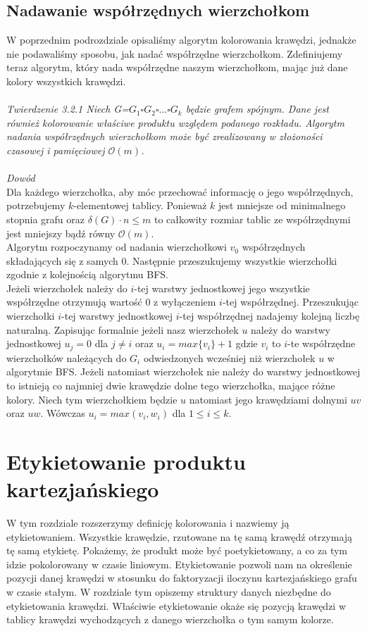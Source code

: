 \documentclass[12pt,a4paper,titlepage]{article}
\begin{document}
\subsection{Nadawanie współrzędnych wierzchołkom}
W poprzednim podrozdziale opisaliśmy algorytm kolorowania krawędzi, jednakże nie podawaliśmy sposobu, jak nadać współrzędne wierzchołkom. Zdefiniujemy teraz algorytm, który nada współrzędne naszym wierzchołkom, mając już dane kolory wszystkich krawędzi.\\
\\
\textit{Twierdzenie 3.2.1 Niech G=$G_1 \square G_2 \square ... \square G_k$ będzie grafem spójnym. Dane jest również kolorowanie właściwe produktu względem podanego rozkładu. Algorytm nadania współrzędnych wierzchołkom może być zrealizowany w złożoności czasowej i pamięciowej $\mathcal{O}(m)$.}\\
\\
\textit{Dowód}\\
Dla każdego wierzchołka, aby móc przechować informację o jego współrzędnych, potrzebujemy $k$-elementowej tablicy. Ponieważ $k$ jest mniejsze od minimalnego stopnia grafu oraz $\delta(G) \cdot n \leqslant m$ to całkowity rozmiar tablic ze współrzędnymi jest mniejszy bądź równy $\mathcal{O}(m)$.\\
Algorytm rozpoczynamy od nadania wierzchołkowi $v_0$ współrzędnych składających się z samych 0. Następnie przeszukujemy wszystkie wierzchołki zgodnie z kolejnością algorytmu BFS. \\Jeżeli wierzchołek należy do $i$-tej warstwy jednostkowej jego wszystkie współrzędne otrzymują wartość 0 z wyłączeniem $i$-tej współrzędnej. Przeszukując wierzchołki $i$-tej warstwy jednostkowej $i$-tej współrzędnej nadajemy kolejną liczbę naturalną. Zapisując formalnie jeżeli nasz wierzchołek $u$ należy do warstwy jednostkowej $u_j =0$ dla $j \neq i$
oraz $u_i = max\{v_i\}+1$ gdzie $v_i $ to $i$-te współrzędne wierzchołków należących do $G_i$ odwiedzonych wcześniej niż wierzchołek $u$ w algorytmie BFS. 
Jeżeli natomiast wierzchołek nie należy do warstwy jednostkowej to istnieją co najmniej dwie krawędzie dolne tego wierzchołka, mające różne kolory. Niech tym wierzchołkiem będzie $u$ natomiast jego krawędziami dolnymi $uv$ oraz $uw$. Wówczas $u_i = max(v_i , w_i )$ dla $1 \leqslant i \leqslant k$.
\newpage
\section{Etykietowanie produktu kartezjańskiego}
W tym rozdziale rozszerzymy definicję kolorowania i nazwiemy ją etykietowaniem. Wszystkie krawędzie, rzutowane na tę samą krawędź otrzymają tę samą etykietę. Pokażemy, że produkt może być poetykietowany, a co za tym idzie pokolorowany w czasie liniowym. Etykietowanie pozwoli nam na określenie pozycji danej krawędzi w stosunku do faktoryzacji iloczynu kartezjańskiego grafu w czasie stałym. W rozdziale tym opiszemy struktury danych niezbędne do etykietowania krawędzi. Właściwie etykietowanie okaże się pozycją krawędzi w tablicy krawędzi wychodzących z danego wierzchołka o tym samym kolorze. \\
\end{document}

